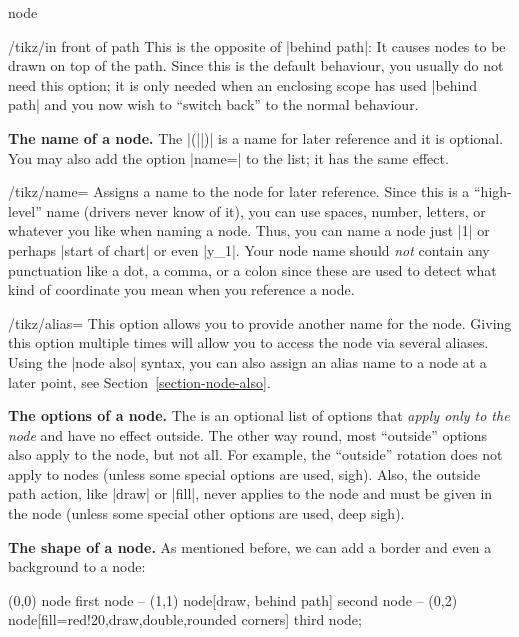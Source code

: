 \begin{pathoperation}{node}
    \begin{key}{/tikz/in front of path}
        This is the opposite of |behind path|: It causes nodes to be drawn on
        top of the path. Since this is the default behaviour, you usually do
        not need this option; it is only needed when an enclosing scope has
        used |behind path| and you now wish to ``switch back'' to the normal
        behaviour.
    \end{key}

    \medskip
    \textbf{The name of a node.}
    The |(||)| is a name for later reference and it is optional. You
    may also add the option |name=| to the  list; it
    has the same effect.

    \begin{key}{/tikz/name=}
        Assigns a name to the node for later reference. Since this is a
        ``high-level'' name (drivers never know of it), you can use spaces,
        number, letters, or whatever you like when naming a node. Thus, you can
        name a node just |1| or perhaps |start of chart| or even |y_1|. Your
        node name should \emph{not} contain any punctuation like a dot, a
        comma, or a colon since these are used to detect what kind of
        coordinate you mean when you reference a node.
    \end{key}

    \begin{key}{/tikz/alias=}
        This option allows you to provide another name for the node. Giving
        this option multiple times will allow you to access the node via
        several aliases. Using the |node also| syntax, you can also assign an
        alias name to a node at a later point, see
        Section~\ref{section-node-also}.
    \end{key}

    \medskip
    \textbf{The options of a node.}
    The  is an optional list of options that \emph{apply only to
    the node} and have no effect outside. The other way round, most ``outside''
    options also apply to the node, but not all. For example, the ``outside''
    rotation does not apply to nodes (unless some special options are used,
    sigh). Also, the outside path action, like |draw| or |fill|, never applies
    to the node and must be given in the node (unless some special other
    options are used, deep sigh).

    \medskip
    \textbf{The shape of a node.}
    As mentioned before, we can add a border and even a background to a node:
\begin{codeexample}[]
\tikz \fill[fill=yellow!80!black]
      (0,0) node {first node}
   -- (1,1) node[draw, behind path] {second node}
   -- (0,2) node[fill=red!20,draw,double,rounded corners] {third node};
\end{codeexample}


\end{pathoperation}
